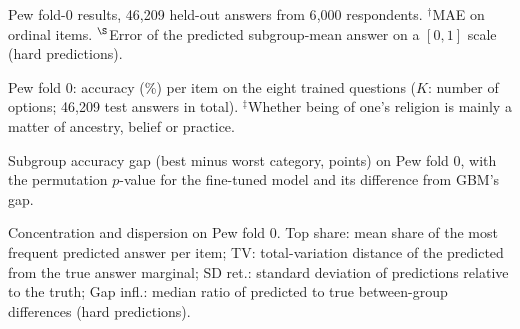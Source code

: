 \documentclass[conference]{IEEEtran}
\begin{document}
\begin{table}[!t]
\caption{Pew fold-0 results, 46{,}209 held-out answers from 6{,}000 respondents. $^\dagger$MAE on ordinal items. $^\S$Error of the predicted subgroup-mean answer on a $[0,1]$ scale (hard predictions).}
\label{tab:pewoverall}
\centering
\footnotesize

\end{table}

\begin{table}[!t]
\caption{Pew fold 0: accuracy (\%) per item on the eight trained questions ($K$: number of options; 46{,}209 test answers in total). $^\ddagger$Whether being of one's religion is mainly a matter of ancestry, belief or practice.}
\label{tab:items}
\centering
\footnotesize

\end{table}

\begin{table}[!t]
\caption{Subgroup accuracy gap (best minus worst category, points) on Pew fold 0, with the permutation $p$-value for the fine-tuned model and its difference from GBM's gap.}
\label{tab:gaps}
\centering
\scriptsize

\end{table}

\begin{table}[!t]
\caption{Concentration and dispersion on Pew fold 0. Top share: mean share of the most frequent predicted answer per item; TV: total-variation distance of the predicted from the true answer marginal; SD ret.: standard deviation of predictions relative to the truth; Gap infl.: median ratio of predicted to true between-group differences (hard predictions).}
\label{tab:conc}
\centering
\scriptsize

\end{table}
\end{document}
